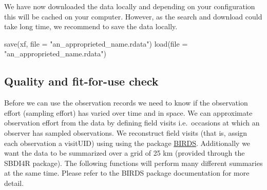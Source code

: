 \documentclass[
  10pt,
]{article}
\newenvironment{Shaded}{\begin{snugshade}}{\end{snugshade}}
\newcommand{\AttributeTok}[1]{\textcolor[rgb]{0.77,0.63,0.00}{#1}}
\newcommand{\CommentTok}[1]{\textcolor[rgb]{0.56,0.35,0.01}{\textit{#1}}}
\newcommand{\FunctionTok}[1]{\textcolor[rgb]{0.00,0.00,0.00}{#1}}
\newcommand{\NormalTok}[1]{#1}
\newcommand{\OtherTok}[1]{\textcolor[rgb]{0.56,0.35,0.01}{#1}}
\newcommand{\SpecialCharTok}[1]{\textcolor[rgb]{0.00,0.00,0.00}{#1}}
\newcommand{\StringTok}[1]{\textcolor[rgb]{0.31,0.60,0.02}{#1}}
\begin{document}
We have now downloaded the data locally and depending on your configuration this
will be cached on your computer. However, as the search and download could take
long time, we recommend to save the data locally.

\begin{Shaded}
\begin{Highlighting}[]
\FunctionTok{save}\NormalTok{(xf, }\AttributeTok{file =} \StringTok{"an\_approprieted\_name.rdata"}\NormalTok{)}
\FunctionTok{load}\NormalTok{(}\AttributeTok{file =} \StringTok{"an\_approprieted\_name.rdata"}\NormalTok{)}
\end{Highlighting}
\end{Shaded}

\hypertarget{quality-and-fit-for-use-check}{%
\subsection{Quality and fit-for-use check}\label{quality-and-fit-for-use-check}}

Before we can use the observation records we need to know if the observation
effort (sampling effort) has varied over time and in space. We can approximate observation effort from the data by
defining field visits i.e.~occasions at which an observer has sampled observations. We reconstruct field visits
(that is, assign each observation a visitUID) using using the package
\href{https://greensway.github.io/BIRDS/}{BIRDS}. Additionally we want the data to be summarized
over a grid of 25 km (provided through the SBDI4R package). The following functions
will perform many different summaries at the same time. Please refer to the BIRDS package
documentation for more detail.

\begin{Shaded}
\end{Shaded}
\end{document}
